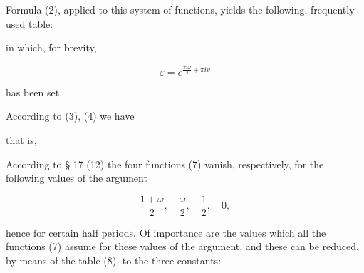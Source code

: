 
Formula (2), applied to this system of functions, yields the
following, frequently used table:


in which, for brevity,

\[
\varepsilon = e^{\frac{\pi i \omega}{4} + \pi i v}
\]

has been set.

According to (3), (4) we have


that is, 

According to § 17 (12) the four functions (7) vanish, respectively,
for the following values of the argument

\[
\frac{1+\omega}{2},\quad \frac{\omega}{2},\quad \frac{1}{2},\quad 0,
\]

hence for certain half periods. Of importance are the values which
all the functions (7) assume for these values of the argument, and
these can be reduced, by means of the table (8), to the three constants:

